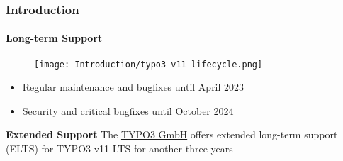%

\begin{frame}[fragile]
	\frametitle{Introduction}
	\framesubtitle{Long-term Support}

	\begin{figure}
		\texttt{[image: Introduction/typo3-v11-lifecycle.png]}
	\end{figure}

	\begin{itemize}
		\item Regular maintenance and bugfixes until April 2023
		\item Security and critical bugfixes until October 2024
	\end{itemize}

	\vspace{0.2cm}
	\textbf{Extended Support}\newline
	\smaller
		The \href{https://typo3.com}{TYPO3 GmbH} offers extended long-term
			support (ELTS) for TYPO3 v11 LTS for another three years
	\normalsize

\end{frame}

